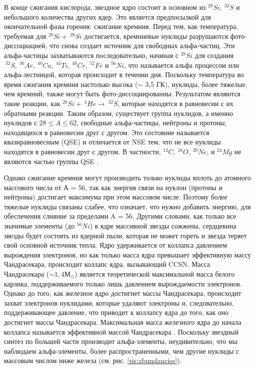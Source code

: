 \documentclass[%
master,    %
natbib,      %
subf,        %
href,        %
colorlinks,  %
]{disser}
\begin{document}
В конце сжигания кислорода, звездное ядро состоит в основном из $^{28}Si, \ ^{32}S$ и небольшого количества других ядер. Это является предпосылкой для окончательной фазы горения: сжигание кремния. Перед тем, как температура, требуемая для $^{28}Si + \ ^{28}Si$ достигается, кремниевые нуклиды разрушаются фото-диссоциацией, что снова создает источник для свободных альфа-частиц. Эти альфа-частицы захватываются последовательно, начиная с $^{28}Si$ для создания $\ ^{32}S, \ ^{36}Ar, \ ^{40}Ca, \ ^{44}Ti, \ ^{48}Cr, \ ^{52}Fe$ и $^{56}Ni$, что называется альфа процессом или альфа-лестницой, которая происходит в течении дня. Поскольку температура во время сжигания кремния настолько высока ($\sim$ 3,5 ГК), нуклиды, более тяжелые, чем кремний, также могут быть фото-диссоциированны. Результатом являются такие реакции, как  $^{28}Si + \ ^4He \rightarrow \ ^{32}S$, которые находятся в равновесии с их обратными реакции. Таким образом, существует группа нуклидов, а именно нуклидов с $28 \le A \le 62$, свободные альфа-частицы, нейтроны и протоны, находящихся в равновесии друг с другом. Это состояние называется квазиравновесным (QSE) и отличается от NSE тем, что не все нуклиды находятся в равновесии друг с другом. В частности, $^{12}C, \ ^{16}O, \ ^{20}Ne$, и $^{24}Mg$ не являются частью группы QSE \cite{qse}.

Однако сжигание кремния могут производить только нуклиды вплоть до атомного массового числа от А = 56, так как энергия связи на нуклон (протоны и нейтроны) достигает максимума при этом массовом числе. Поэтому более тяжелые нуклиды связаны слабее, что означает, что нужно добавить энергию, для обеспечения слияние за пределами A = 56. Другими словами, как только все значимые элементы (до $^{56}Ni$) в ядре массивной звезды сожжены, сердцевина звезды будет состоять из ядерной пыли, которая не может гореть и звезда теряет свой основной источник тепла. Ядро удерживается от коллапса давлением вырождения электронов, но как только масса ядра превышает эффективную массу Чандрасекара, происходит коллапс ядра, вызывающий CCSN. Масса Чандрасекара ($\sim 1,4 М_\odot$) является теоретической максимальной масса белого карлика, поддерживаемого только лишь давлением вырождаемости электронов. Однако до того, как железное ядро достигнет массы Чандрасекара, происходит захват электронов нуклидами, которые удаляют электроны и, следовательно, поддерживающее давление, что приводит к коллапсу ядра до того, как оно достигнет массы Чандрасекара. Максимальная масса железного ядра до начала коллапса называется эффективной массой Чандрасекара \cite{massive}. Поскольку звездный синтез по большей части производит альфа-элементы, неудивительно, что мы наблюдаем альфа-элементы, более распространенными, чем другие нуклиды с массовым числом ниже железа (см. рис. \ref{ris:abundancies}).
\end{document}
